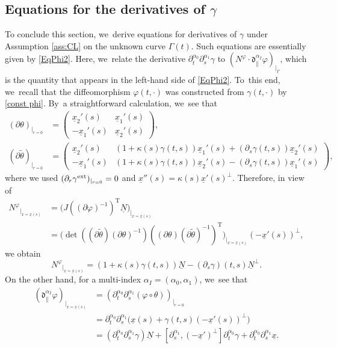\documentclass[10pt]{amsart}
\newcommand{\dpar}{{\mathfrak d}_{\parallel}}
\newcommand{\dt}{\partial_t}
\newcommand{\ul}[1]{\underline{#1}}
\newcommand{\itGamma}{\mathit{\Gamma}}
\theoremstyle{definition}
\begin{document}
\subsection{Equations for the derivatives of $\gamma$}\label{subsect:Eqg}
To conclude this section, we~derive equations for derivatives of $\gamma$ under Assumption \ref{ass:CL} on the unknown curve $\itGamma(t)$.
Such equations are essentially given by \eqref{EqPhi2}.
Here, we~relate the derivative $\dt^{\alpha_0}\partial_s^{\alpha_1}\gamma$ to $(N^\varphi\cdot\dpar^{\alpha_I}\varphi)_{\vert_{\ul{\itGamma}}}$,
which is the quantity that appears in the left-hand side of \eqref{EqPhi2}.
To~this end, we~recall that the diffeomorphism $\varphi(t,\cdot)$ was constructed from $\gamma(t,\cdot)$ by \eqref{const phi}. By~a straightforward calculation, we~see that
\begin{align*}
(\partial\theta)_{\vert_{r=0}} &=
\begin{pmatrix}
\ul{x}_2'(s) & \ul{x}_1'(s) \\
-\ul{x}_1'(s) & \ul{x}_2'(s)
\end{pmatrix}, \\
(\partial\tilde{\theta})_{\vert_{r=0}} &=
\begin{pmatrix}
\ul{x}_2'(s) & (1+\kappa(s)\gamma(t,s))\ul{x}_1'(s) + (\partial_s\gamma(t,s))\ul{x}_2'(s) \\
-\ul{x}_1'(s) & (1+\kappa(s)\gamma(t,s))\ul{x}_2'(s) - (\partial_s\gamma(t,s))\ul{x}_1'(s)
\end{pmatrix},
\end{align*}
where we used $(\partial_r\gamma^{\rm ext})_{\vert_{r=0}} = 0$ and $\ul{x}''(s) = \kappa(s)\ul{x}'(s)^\perp$.
Therefore, in view of
\begin{align*}
{N^\varphi}_{\vert_{x=\ul{x}(s)}}
&= \bigl(J((\partial\varphi)^{-1})^\mathrm{T}\ul{N}\bigr)_{\vert_{x=\ul{x}(s)}}\\
&= \bigl(\det((\partial\widetilde{\theta})(\partial\theta)^{-1}) ((\partial\theta)(\partial\widetilde{\theta})^{-1})^\mathrm{T}\bigr)_{\vert_{x=\ul{x}(s)}}
(-\ul{x}'(s))^\perp,
\end{align*}
we obtain
\begin{equation}\label{Nphi2}
{N^\varphi}_{\vert_{x=\ul{x}(s)}}
= (1+\kappa(s)\gamma(t,s))\ul{N} - (\partial_s\gamma)(t,s)\ul{N}^\perp.
\end{equation}
On the other hand, for a multi-index $\alpha_I=(\alpha_0,\alpha_1)$, we~see that
\begin{align*}
(\dpar^{\alpha_I}\varphi)_{\vert_{x=\ul{x}(s)}}
&= (\dt^{\alpha_0}\partial_s^{\alpha_1}(\varphi\circ\theta))_{\vert_{r=0}} \\
&= \dt^{\alpha_0}\partial_s^{\alpha_1}\bigl(\ul{x}(s)+\gamma(t,s)(-\ul{x}'(s))^\perp \bigr) \\
&= (\dt^{\alpha_0}\partial_s^{\alpha_1}\gamma)\ul{N}
+ [\partial_s^{\alpha_1},(-\ul{x}')^\perp]\dt^{\alpha_0}\gamma + \dt^{\alpha_0}\partial_s^{\alpha_1}\ul{x}.
\end{align*}
\end{document}
